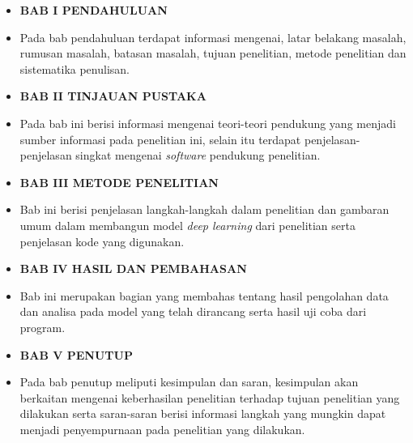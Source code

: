 \begin{itemize}[label={\phantom{•}}]
    \item \textbf{BAB I PENDAHULUAN}
    \item[] Pada bab pendahuluan terdapat informasi mengenai, latar belakang masalah, rumusan masalah, batasan masalah, tujuan penelitian, metode penelitian dan sistematika penulisan.
    \item \textbf{BAB II TINJAUAN PUSTAKA}
    \item[] Pada bab ini berisi informasi mengenai teori-teori pendukung yang menjadi sumber informasi pada penelitian ini, selain itu terdapat penjelasan-penjelasan singkat mengenai \textit{software} pendukung penelitian.
    \item \textbf{BAB III METODE PENELITIAN}
    \item[] Bab ini berisi penjelasan langkah-langkah dalam penelitian dan gambaran umum dalam membangun model \textit{deep learning} dari penelitian serta penjelasan kode yang digunakan.
    \item \textbf{BAB IV HASIL DAN PEMBAHASAN}
    \item[] Bab ini merupakan bagian yang membahas tentang hasil pengolahan data dan analisa pada model yang telah dirancang serta hasil uji coba dari program.
    \item \textbf{BAB V PENUTUP}
    \item[] Pada bab penutup meliputi kesimpulan dan saran, kesimpulan akan berkaitan mengenai keberhasilan penelitian terhadap tujuan penelitian yang dilakukan serta saran-saran berisi informasi langkah yang mungkin dapat menjadi penyempurnaan pada penelitian yang dilakukan.
\end{itemize}
